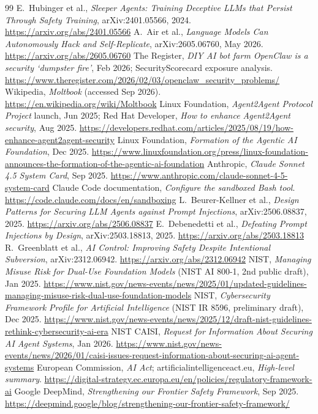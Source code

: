 \documentclass[11pt,letterpaper]{article}
\begin{document}
\begin{thebibliography}{99}
 E.~Hubinger et al., \emph{Sleeper Agents: Training Deceptive LLMs that Persist Through Safety Training}, arXiv:2401.05566, 2024. \url{https://arxiv.org/abs/2401.05566}
 A.~Air et al., \emph{Language Models Can Autonomously Hack and Self-Replicate}, arXiv:2605.06760, May 2026. \url{https://arxiv.org/abs/2605.06760}
 The Register, \emph{DIY AI bot farm OpenClaw is a security `dumpster fire'}, Feb 2026; SecurityScorecard exposure analysis. \url{https://www.theregister.com/2026/02/03/openclaw_security_problems/}
 Wikipedia, \emph{Moltbook} (accessed Sep 2026). \url{https://en.wikipedia.org/wiki/Moltbook}
 Linux Foundation, \emph{Agent2Agent Protocol Project} launch, Jun 2025; Red Hat Developer, \emph{How to enhance Agent2Agent security}, Aug 2025. \url{https://developers.redhat.com/articles/2025/08/19/how-enhance-agent2agent-security}
 Linux Foundation, \emph{Formation of the Agentic AI Foundation}, Dec 2025. \url{https://www.linuxfoundation.org/press/linux-foundation-announces-the-formation-of-the-agentic-ai-foundation}
 Anthropic, \emph{Claude Sonnet 4.5 System Card}, Sep 2025. \url{https://www.anthropic.com/claude-sonnet-4-5-system-card}
 Claude Code documentation, \emph{Configure the sandboxed Bash tool}. \url{https://code.claude.com/docs/en/sandboxing}
 L.~Beurer-Kellner et al., \emph{Design Patterns for Securing LLM Agents against Prompt Injections}, arXiv:2506.08837, 2025. \url{https://arxiv.org/abs/2506.08837}
 E.~Debenedetti et al., \emph{Defeating Prompt Injections by Design}, arXiv:2503.18813, 2025. \url{https://arxiv.org/abs/2503.18813}
 R.~Greenblatt et al., \emph{AI Control: Improving Safety Despite Intentional Subversion}, arXiv:2312.06942. \url{https://arxiv.org/abs/2312.06942}
 NIST, \emph{Managing Misuse Risk for Dual-Use Foundation Models} (NIST AI 800-1, 2nd public draft), Jan 2025. \url{https://www.nist.gov/news-events/news/2025/01/updated-guidelines-managing-misuse-risk-dual-use-foundation-models}
 NIST, \emph{Cybersecurity Framework Profile for Artificial Intelligence} (NIST IR 8596, preliminary draft), Dec 2025. \url{https://www.nist.gov/news-events/news/2025/12/draft-nist-guidelines-rethink-cybersecurity-ai-era}
 NIST CAISI, \emph{Request for Information About Securing AI Agent Systems}, Jan 2026. \url{https://www.nist.gov/news-events/news/2026/01/caisi-issues-request-information-about-securing-ai-agent-systems}
 European Commission, \emph{AI Act}; artificialintelligenceact.eu, \emph{High-level summary}. \url{https://digital-strategy.ec.europa.eu/en/policies/regulatory-framework-ai}
 Google DeepMind, \emph{Strengthening our Frontier Safety Framework}, Sep 2025. \url{https://deepmind.google/blog/strengthening-our-frontier-safety-framework/}


\end{thebibliography}
\end{document}
